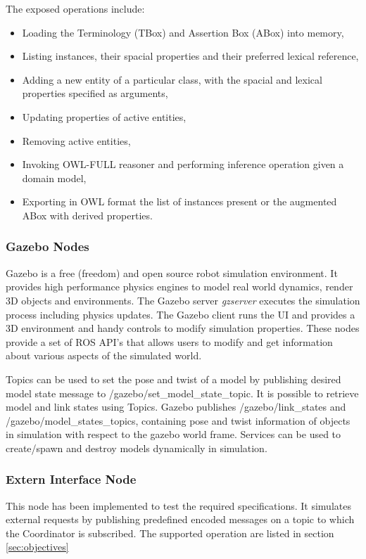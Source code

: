 The exposed operations include:

\begin{itemize}
\item Loading the Terminology (TBox) and Assertion Box (ABox) into memory,
\item Listing instances, their spacial properties and their preferred lexical reference,
\item Adding a new entity of a particular class, with the spacial and lexical properties specified as arguments,
\item Updating properties of active entities,
\item Removing active entities,
\item Invoking OWL-FULL reasoner and performing inference operation given a domain model, 
\item Exporting in OWL format the list of instances present or the augmented ABox with derived properties.

\end{itemize}

\subsubsection{Gazebo Nodes}

Gazebo is a free (freedom) and open source robot simulation environment. It provides high performance physics engines to model real world dynamics, render 3D objects and environments. The Gazebo server \textit{gzserver} executes the simulation process including physics updates. The Gazebo client runs the UI and provides a 3D environment and handy controls to modify simulation properties. These nodes provide a set of ROS API's that allows users to modify and get information about various aspects of the simulated world.

Topics can be used to set the pose and twist of a model by publishing desired model state message to /gazebo/set\_model\_state\_topic. It is possible to retrieve model and link states using Topics. Gazebo publishes /gazebo/link\_states and /gazebo/model\_states\_topics, containing pose and twist information of objects in simulation with respect to the gazebo world frame. Services can be used to create/spawn and destroy models dynamically in simulation.

\subsubsection{Extern Interface Node}
This node has been implemented to test the required specifications. It simulates external requests by publishing predefined encoded messages on a topic to which the Coordinator is subscribed. The supported operation are listed in section \ref{sec:objectives}


